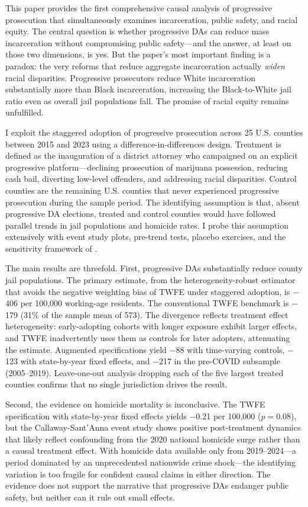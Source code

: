 \documentclass[12pt]{article}
\begin{document}
This paper provides the first comprehensive causal analysis of progressive prosecution that simultaneously examines incarceration, public safety, and racial equity. The central question is whether progressive DAs can reduce mass incarceration without compromising public safety---and the answer, at least on those two dimensions, is yes. But the paper's most important finding is a paradox: the very reforms that reduce aggregate incarceration actually \textit{widen} racial disparities. Progressive prosecutors reduce White incarceration substantially more than Black incarceration, increasing the Black-to-White jail ratio even as overall jail populations fall. The promise of racial equity remains unfulfilled.

I exploit the staggered adoption of progressive prosecution across 25 U.S. counties between 2015 and 2023 using a difference-in-differences design. Treatment is defined as the inauguration of a district attorney who campaigned on an explicit progressive platform---declining prosecution of marijuana possession, reducing cash bail, diverting low-level offenders, and addressing racial disparities. Control counties are the remaining U.S. counties that never experienced progressive prosecution during the sample period. The identifying assumption is that, absent progressive DA elections, treated and control counties would have followed parallel trends in jail populations and homicide rates. I probe this assumption extensively with event study plots, pre-trend tests, placebo exercises, and the sensitivity framework of \citet{rambachan2023honest}.

The main results are threefold. First, progressive DAs substantially reduce county jail populations. The primary estimate, from the heterogeneity-robust \citet{callaway2021did} estimator that avoids the negative weighting bias of TWFE under staggered adoption, is $-$406 per 100,000 working-age residents. The conventional TWFE benchmark is $-$179 (31\% of the sample mean of 573). The divergence reflects treatment effect heterogeneity: early-adopting cohorts with longer exposure exhibit larger effects, and TWFE inadvertently uses them as controls for later adopters, attenuating the estimate. Augmented specifications yield $-$88 with time-varying controls, $-$123 with state-by-year fixed effects, and $-$217 in the pre-COVID subsample (2005--2019). Leave-one-out analysis dropping each of the five largest treated counties confirms that no single jurisdiction drives the result.

Second, the evidence on homicide mortality is inconclusive. The TWFE specification with state-by-year fixed effects yields $-$0.21 per 100,000 ($p = 0.08$), but the Callaway-Sant'Anna event study shows positive post-treatment dynamics that likely reflect confounding from the 2020 national homicide surge rather than a causal treatment effect. With homicide data available only from 2019--2024---a period dominated by an unprecedented nationwide crime shock---the identifying variation is too fragile for confident causal claims in either direction. The evidence does not support the narrative that progressive DAs endanger public safety, but neither can it rule out small effects.
\end{document}
